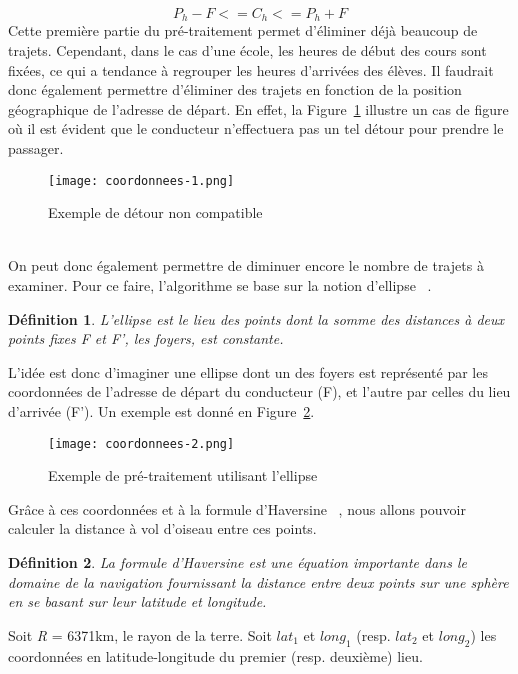\documentclass[12pt, a4paper, oneside]{article}
\newtheorem{defi}{D\'efinition}[section]
\begin{document}
{{\begin{equation*}
        P_{h} - F <= C_{h} <= P_{h} + F
    \end{equation*}
    Cette première partie du pré-traitement permet d'éliminer déjà beaucoup de trajets. Cependant, dans le cas d'une école, les heures de début des cours sont fixées, ce qui a tendance à regrouper les heures d'arrivées des élèves. Il faudrait donc également permettre d'éliminer des trajets en fonction de la position géographique de l'adresse de départ. En effet, la Figure~\ref{coordonnees-1} illustre un cas de figure où il est évident que le conducteur n'effectuera pas un tel détour pour prendre le passager. \\
    \begin{figure}[!htb]
        \begin{center}
         \texttt{[image: coordonnees-1.png]}
         \caption{Exemple de détour non compatible}
         \label{coordonnees-1}
        \end{center}
       \end{figure}\\
       On peut donc également permettre de diminuer encore le nombre de trajets à examiner. Pour ce faire, l'algorithme se base sur la notion d'ellipse ~\cite{ellipse}.
    \begin{defi}
        L'ellipse est le lieu des points dont la somme des distances à deux points fixes F et F', les foyers, est constante.
    \end{defi}
     L'idée est donc d'imaginer une ellipse dont un des foyers est représenté par les coordonnées de l'adresse de départ du conducteur (F), et l'autre par celles du lieu d'arrivée (F'). Un exemple est donné en Figure~\ref{coordonnees-2}.
     \begin{figure}[!htb]
      \begin{center}
       \texttt{[image: coordonnees-2.png]}
       \caption{Exemple de pré-traitement utilisant l'ellipse}
       \label{coordonnees-2}
      \end{center}
     \end{figure}
      Grâce à ces coordonnées et à la formule d'Haversine ~\cite{haversine}, nous allons pouvoir calculer la distance à vol d'oiseau entre ces points. 
     \begin{defi}
         La formule d'Haversine est une équation importante dans le domaine de la navigation fournissant la distance entre deux points sur une sphère en se basant sur leur latitude et longitude.
     \end{defi}
     \noindent Soit \textit{R} = 6371km, le rayon de la terre. Soit \textit{$lat_{1}$} et \textit{$long_{1}$} (resp. \textit{$lat_{2}$} et \textit{$long_{2}$}) les coordonnées en latitude-longitude du premier (resp. deuxième) lieu. \\
}}
\end{document}
